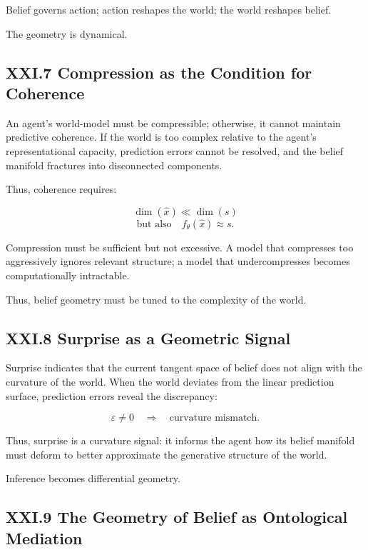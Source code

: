\documentclass[12pt,letterpaper]{article}
\begin{document}
Belief governs action; action reshapes the world; the world reshapes belief.

The geometry is dynamical.

\subsection{XXI.7 Compression as the Condition for Coherence}

An agent’s world-model must be compressible; otherwise, it cannot maintain predictive coherence. If the world is too complex relative to the agent’s representational capacity, prediction errors cannot be resolved, and the belief manifold fractures into disconnected components.

Thus, coherence requires:

\[
\dim(\hat{x}) \ll \dim(s)
\]
\[
\text{but also} \quad f_\theta(\hat{x}) \approx s.
\]

Compression must be sufficient but not excessive.  
A model that compresses too aggressively ignores relevant structure; a model that undercompresses becomes computationally intractable.

Thus, belief geometry must be tuned to the complexity of the world.

\subsection{XXI.8 Surprise as a Geometric Signal}

Surprise indicates that the current tangent space of belief does not align with the curvature of the world. When the world deviates from the linear prediction surface, prediction errors reveal the discrepancy:

\[
\varepsilon \neq 0 \quad \Rightarrow \quad \text{curvature mismatch}.
\]

Thus, surprise is a curvature signal: it informs the agent how its belief manifold must deform to better approximate the generative structure of the world.

Inference becomes differential geometry.

\subsection{XXI.9 The Geometry of Belief as Ontological Mediation}
\end{document}
